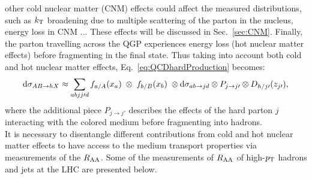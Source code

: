 other cold nuclear matter (CNM) effects could affect the measured distributions,
such as $k_{\rm T}$ broadening due to multiple scattering of the
parton in the nucleus, energy loss in CNM ... These effects 
will be discussed in Sec.~\ref{sec:CNM}.
Finally, the parton travelling across the QGP experiences energy loss (hot nuclear matter effects) 
  before fragmenting in the final state. Thus taking into account both cold and hot nuclear matter effects, 
Eq.~\ref{eq:QCDhardProduction} becomes:
\begin{equation}
\label{eq:QCDwNuclEffects}
{\rm d}\sigma_{AB\rightarrow hX} \approx \sum_{abjj\prime d} f_{a/A} (x_a) \; \otimes \;f_{b/B} (x_b) \;\otimes {\rm d}\sigma_{ab\rightarrow jd} \otimes P_{j\rightarrow j\prime} \otimes D_{h/j\prime}(z_{j\prime}), 
\end{equation}
where the additional piece $P_{j\rightarrow j\prime}$ describes the 
effects of the hard parton $j$ interacting with the colored medium 
before fragmenting into hadrons. \\

It is necessary to disentangle different contributions from cold and hot nuclear matter 
effects to have access to the medium transport properties via
 measurements of the $R_{\rm AA}$. Some of the measurements of $R_{\rm AA}$
  of high-$p_{\rm T}$ hadrons and jets at the LHC are presented below.

